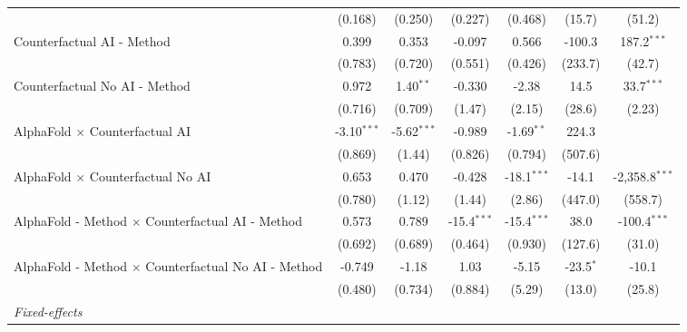 \begin{tabular}{lcccccc}
                                                              & (0.168)       & (0.250)       & (0.227)       & (0.468)       & (15.7)      & (51.2)\\   
   Counterfactual AI - Method                                 & 0.399         & 0.353         & -0.097        & 0.566         & -100.3      & 187.2$^{***}$\\   
                                                              & (0.783)       & (0.720)       & (0.551)       & (0.426)       & (233.7)     & (42.7)\\   
   Counterfactual No AI - Method                              & 0.972         & 1.40$^{**}$   & -0.330        & -2.38         & 14.5        & 33.7$^{***}$\\   
                                                              & (0.716)       & (0.709)       & (1.47)        & (2.15)        & (28.6)      & (2.23)\\   
   AlphaFold $\times$ Counterfactual AI                       & -3.10$^{***}$ & -5.62$^{***}$ & -0.989        & -1.69$^{**}$  & 224.3       &   \\   
                                                              & (0.869)       & (1.44)        & (0.826)       & (0.794)       & (507.6)     &   \\   
   AlphaFold $\times$ Counterfactual No AI                    & 0.653         & 0.470         & -0.428        & -18.1$^{***}$ & -14.1       & -2,358.8$^{***}$\\   
                                                              & (0.780)       & (1.12)        & (1.44)        & (2.86)        & (447.0)     & (558.7)\\   
   AlphaFold - Method $\times$ Counterfactual AI - Method     & 0.573         & 0.789         & -15.4$^{***}$ & -15.4$^{***}$ & 38.0        & -100.4$^{***}$\\   
                                                              & (0.692)       & (0.689)       & (0.464)       & (0.930)       & (127.6)     & (31.0)\\   
   AlphaFold - Method $\times$ Counterfactual No AI - Method  & -0.749        & -1.18         & 1.03          & -5.15         & -23.5$^{*}$ & -10.1\\   
                                                              & (0.480)       & (0.734)       & (0.884)       & (5.29)        & (13.0)      & (25.8)\\   
   \midrule
   \emph{Fixed-effects}\\

\end{tabular}
